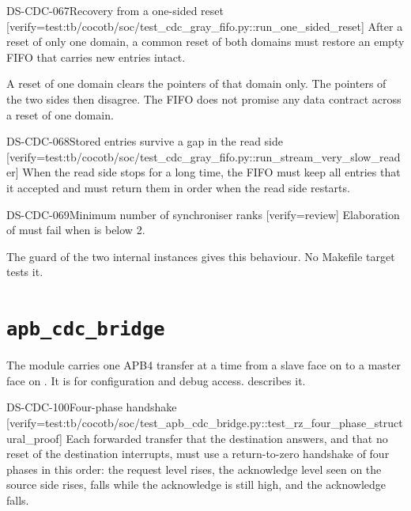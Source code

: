 \begin{requirement}{DS-CDC-067}{Recovery from a one-sided reset}
[verify={test:tb/cocotb/soc/test_cdc_gray_fifo.py::run_one_sided_reset}]
After a reset of only one domain, a common reset of both domains must restore an empty FIFO that carries new entries intact.
\end{requirement}
\begin{information}
A reset of one domain clears the pointers of that domain only. The pointers of the two sides then disagree. The FIFO does not promise any data contract across a reset of one domain.
\end{information}

\begin{requirement}{DS-CDC-068}{Stored entries survive a gap in the read side}
[verify={test:tb/cocotb/soc/test_cdc_gray_fifo.py::run_stream_very_slow_reader}]
When the read side stops for a long time, the FIFO must keep all entries that it accepted and must return them in order when the read side restarts.
\end{requirement}

\begin{requirement}{DS-CDC-069}{Minimum number of synchroniser ranks}
[verify={review}]
Elaboration of  must fail when  is below 2.
\end{requirement}
\begin{information}
The guard of the two internal  instances gives this behaviour. No Makefile target tests it.
\end{information}

\section{\texttt{apb\_cdc\_bridge}}\label{ds:mod:apb-cdc-bridge}
The module  carries one APB4 transfer at a time from a slave face on  to a master face on . It is for configuration and debug access.  describes it.

\begin{requirement}{DS-CDC-100}{Four-phase handshake}
[verify={test:tb/cocotb/soc/test_apb_cdc_bridge.py::test_rz_four_phase_structural_proof}]
Each forwarded transfer that the destination answers, and that no reset of the destination interrupts, must use a return-to-zero handshake of four phases in this order: the request level  rises, the acknowledge level seen on the source side rises,  falls while the acknowledge is still high, and the acknowledge falls.
\end{requirement}

